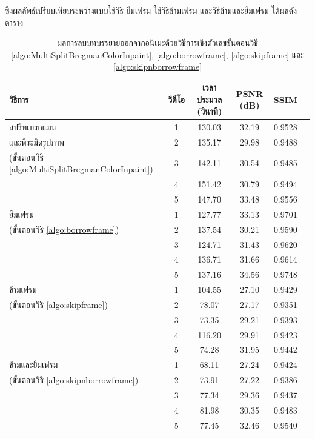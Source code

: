 	\vspace{0.5cm}
	\hspace{1cm}ซึ่งผลลัพธ์เปรียบเทียบระหว่างแบบใช้วิธี ยืมเฟรม ใช้วิธีข้ามเฟรม และวิธีข้ามและยืมเฟรม ได้ผลดังตาราง
		\begin{table}[H]
		\small
		\centering
		\begin{tabular}[ht]{|l|c|c|c|c|c|}
			\hline
			วิธีการ  & วิดีโอ &เวลาประมวล  (วินาที) & PSNR (dB) & SSIM \\
			\hline
			สปริทเบรกแมน & 1 & 130.03  & 32.19 & 0.9528  \\ 
			และพีระมิดรูปภาพ& 2 & 135.17 & 29.98 & 0.9488 \\
			(ขั้นตอนวิธี \ref{algo:MultiSplitBregmanColorInpaint})& 3 & 142.11 & 30.54 & 0.9485 \\
			& 4 & 151.42 & 30.79 & 0.9494 \\
			& 5 & 147.70 & 33.48 & 0.9556 \\
			\hline
			ยืมเฟรม & 1 & 127.77  & 33.13& 0.9701 \\ 
			(ขั้นตอนวิธี \ref{algo:borrowframe})& 2 & 137.54 & 30.21 & 0.9590 \\
			& 3 & 124.71 & 31.43 & 0.9620 \\
			& 4 & 136.71 & 31.66 & 0.9614 \\
			& 5 & 137.16 & 34.56 &  0.9748 \\
			\hline
			ข้ามเฟรม & 1 &  104.55 & 27.10 &  0.9429\\ 
			(ขั้นตอนวิธี \ref{algo:skipframe})& 2 & 78.07 & 27.17 & 0.9351 \\
			& 3 & 73.35 & 29.21 & 0.9393\\
			& 4 & 116.20 & 29.91 & 0.9423 \\
			& 5 & 74.28 & 31.95 &  0.9442\\
			\hline
			ข้ามและยืมเฟรม & 1 & 68.11 & 27.24 & 0.9424 \\ 
			(ขั้นตอนวิธี \ref{algo:skipnborrowframe})& 2 & 73.91 & 27.22 & 0.9386 \\
			& 3 & 77.34 & 29.36 & 0.9437 \\
			& 4 & 81.98 & 30.35 & 0.9483  \\
			& 5 & 77.45  & 32.46 & 0.9540 \\
			\hline
		\end{tabular}
		\label{result:table-removesub1}
		\caption{ผลการลบบทบรรยายออกจากอนิเมะด้วยวิธีการเชิงตัวเลขขั้นตอนวิธี \ref{algo:MultiSplitBregmanColorInpaint}, \ref{algo:borrowframe}, \ref{algo:skipframe} และ \ref{algo:skipnborrowframe}}
	\end{table}	
